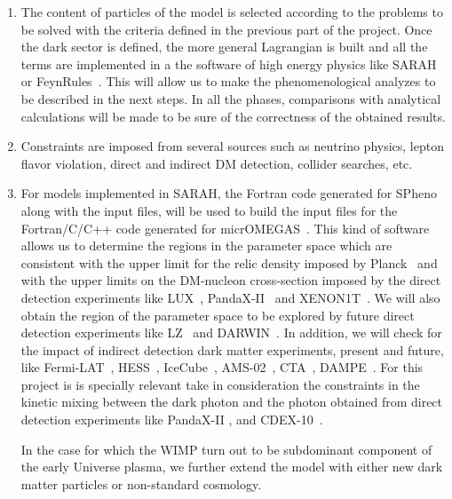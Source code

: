 \documentclass[a4paper,10pt,epsfig,epsf,amsfonts,amsmath]{article}
\begin{document}
\begin{enumerate}

\item The content of particles of the model is selected according to
  the problems to be solved with the criteria defined in the previous
  part of the project.  Once the dark sector is defined, the more
  general Lagrangian is built and all the terms are implemented in a
  the software of high energy physics like SARAH~\cite{Staub:2013tta} or
  FeynRules~\cite{Alloul:2013bka}.
  This will allow us to make the phenomenological analyzes to be
  described in the next steps.  In all the phases, comparisons with
  analytical calculations will be made to be sure of the correctness
  of the obtained results.
  
\item Constraints are imposed from several sources such as neutrino
  physics, lepton flavor violation, direct and indirect DM detection,
  collider searches, etc.

\item For models implemented in SARAH, the Fortran code generated for
  SPheno along with the input files, will be used to build the input
  files for the Fortran/C/C++ code generated for
  micrOMEGAS~\cite{Belanger:2010gh}. This kind of software allows us to
  determine the regions in the parameter space which are consistent
  with the upper limit for the relic density imposed by
  Planck~\cite{Aghanim:2018eyx} and with the upper limits on the
  DM-nucleon cross-section imposed by the direct detection experiments
  like LUX~\cite{Akerib:2018lyp}, PandaX-II~\cite{Tan:2016diz} and
  XENON1T~\cite{Aprile:2017iyp}.
  We will also obtain the region of the parameter space to be explored
  by future direct detection experiments like LZ~\cite{Akerib:2018lyp}
  and DARWIN~\cite{Aalbers:2016jon}.
  In addition, we will check for the impact of indirect detection dark
  matter experiments, present and future, like
  Fermi-LAT~\cite{Ajello:2018sxm}, HESS~\cite{Abdallah:2016ygi},
  IceCube~\cite{Iovine:2019rmd}, AMS-02~\cite{Giovacchini:2020vxz},
  CTA~\cite{Acharya:2017ttl}, DAMPE~\cite{Jiang:2020jbc}.
  For this project is is specially relevant take in consideration the constraints in the kinetic mixing between
  the dark photon and the photon obtained from direct detection experiments
  like PandaX-II \cite{Ren:2018gyx}, and CDEX-10~\cite{She:2019skm}.
  

  In the case for which the WIMP turn out to be subdominant component
  of the early Universe plasma, we further extend the model with
  either new dark matter particles or non-standard cosmology.


\end{enumerate}
\end{document}
